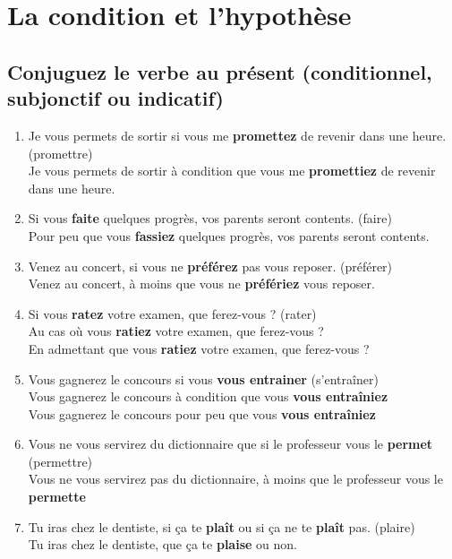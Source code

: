 \documentclass[12pt]{article}
\newcommand{\colo}[1]{{\color{blue}\textbf{#1}}}
\begin{document}
\section{La condition et l’hypothèse}
\subsection{Conjuguez le verbe au présent (conditionnel, subjonctif ou indicatif)}
\begin{enumerate}

	\item Je vous permets de sortir si vous me \colo{promettez} de revenir dans une heure. (promettre) \\
	       Je vous permets de sortir à condition que vous me \colo{promettiez} de revenir dans une heure.
	\item Si vous \colo{faite} quelques progrès, vos parents seront contents. (faire) \\
	       Pour peu que vous \colo{fassiez} quelques progrès, vos parents seront contents. 
	      \item Venez au concert, si vous ne \colo{préférez} pas vous reposer. (préférer) \\
	       Venez au concert, à moins que vous ne \colo{préfériez} vous reposer.
	\item Si vous \colo{ratez} votre examen, que ferez-vous ? (rater) \\
	       Au cas où vous \colo{ratiez} votre examen, que ferez-vous ? \\ 
	       En admettant que vous \colo{ratiez} votre examen, que ferez-vous ? 
	      \item Vous gagnerez le concours si vous \colo{vous entrainer} (s'entraîner) \\ 
	       Vous gagnerez le concours à condition que vous \colo{vous entraîniez} \\ 
	       Vous gagnerez le concours pour peu que vous \colo{vous entraîniez}
	\item Vous ne vous servirez du dictionnaire que si le professeur vous le \colo{permet} (permettre) \\
	       Vous ne vous servirez pas du dictionnaire, à moins que le professeur vous le \colo{permette}
	\item Tu iras chez le dentiste, si ça te \colo{plaît} ou si ça ne te \colo{plaît} pas. (plaire) \\
	       Tu iras chez le dentiste, que ça te \colo{plaise} ou non.
\end{enumerate}
\end{document}
